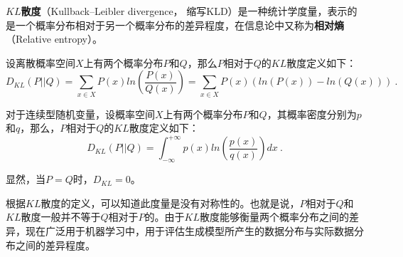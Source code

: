 


\textbf{$KL$散度}（Kullback–Leibler divergence， 缩写KLD）是一种统计学度量，表示的是一个概率分布相对于另一个概率分布的差异程度，在信息论中又称为\textbf{相对熵}（Relative entropy）。

设离散概率空间$X$上有两个概率分布$P$和$Q$，那么$P$相对于$Q$的$KL$散度定义如下：
\begin{equation}
D_{KL}(P||Q)=\sum_{x\in X}P(x)ln(\frac{P(x)}{Q(x)})=\sum_{x\in X}P(x)(ln(P(x))-ln(Q(x)))~.
\end{equation}

对于连续型随机变量，设概率空间$X$上有两个概率分布$P$和$Q$，其概率密度分别为$p$和$q$，那么，$P$相对于$Q$的$KL$散度定义如下：
\begin{equation}
D_{KL}(P||Q)=\int_{-\infty}^{+\infty}p(x)ln(\frac{p(x)}{q(x)})dx~.
\end{equation}

显然，当$P=Q$时，$D_{KL}=0$。

根据$KL$散度的定义，可以知道此度量是没有对称性的。也就是说，$P$相对于$Q$和$KL$散度一般并不等于$Q$相对于$P$的。由于$KL$散度能够衡量两个概率分布之间的差异，现在广泛用于机器学习中，用于评估生成模型所产生的数据分布与实际数据分布之间的差异程度。
